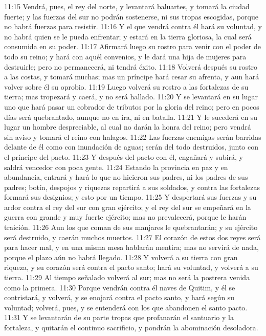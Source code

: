 11:15 Vendrá, pues, el rey del norte, y levantará baluartes, y tomará la ciudad fuerte; y las fuerzas del sur no podrán sostenerse, ni sus tropas escogidas, porque no habrá fuerzas para resistir. 
11:16 Y el que vendrá contra él hará su voluntad, y no habrá quien se le pueda enfrentar; y estará en la tierra gloriosa, la cual será consumida en su poder. 
11:17 Afirmará luego su rostro para venir con el poder de todo su reino; y hará con aquél convenios, y le dará una hija de mujeres para destruirle; pero no permanecerá, ni tendrá éxito. 
11:18 Volverá después su rostro a las costas, y tomará muchas; mas un príncipe hará cesar su afrenta, y aun hará volver sobre él su oprobio. 
11:19 Luego volverá su rostro a las fortalezas de su tierra; mas tropezará y caerá, y no será hallado. 
11:20 Y se levantará en su lugar uno que hará pasar un cobrador de tributos por la gloria del reino; pero en pocos días será quebrantado, aunque no en ira, ni en batalla. 
11:21 Y le sucederá en su lugar un hombre despreciable, al cual no darán la honra del reino; pero vendrá sin aviso y tomará el reino con halagos. 
11:22 Las fuerzas enemigas serán barridas delante de él como con inundación de aguas; serán del todo destruidos, junto con el príncipe del pacto. 
11:23 Y después del pacto con él, engañará y subirá, y saldrá vencedor con poca gente. 
11:24 Estando la provincia en paz y en abundancia, entrará y hará lo que no hicieron sus padres, ni los padres de sus padres; botín, despojos y riquezas repartirá a sus soldados, y contra las fortalezas formará sus designios; y esto por un tiempo. 
11:25 Y despertará sus fuerzas y su ardor contra el rey del sur con gran ejército; y el rey del sur se empeñará en la guerra con grande y muy fuerte ejército; mas no prevalecerá, porque le harán traición. 
11:26 Aun los que coman de sus manjares le quebrantarán; y su ejército será destruido, y caerán muchos muertos. 
11:27 El corazón de estos dos reyes será para hacer mal, y en una misma mesa hablarán mentira; mas no servirá de nada, porque el plazo aún no habrá llegado. 
11:28 Y volverá a su tierra con gran riqueza, y su corazón será contra el pacto santo; hará su voluntad, y volverá a su tierra. 
11:29 Al tiempo señalado volverá al sur; mas no será la postrera venida como la primera. 
11:30 Porque vendrán contra él naves de Quitim, y él se contristará, y volverá, y se enojará contra el pacto santo, y hará según su voluntad; volverá, pues, y se entenderá con los que abandonen el santo pacto. 
11:31 Y se levantarán de su parte tropas que profanarán el santuario y la fortaleza, y quitarán el continuo sacrificio, y pondrán la abominación desoladora. 
